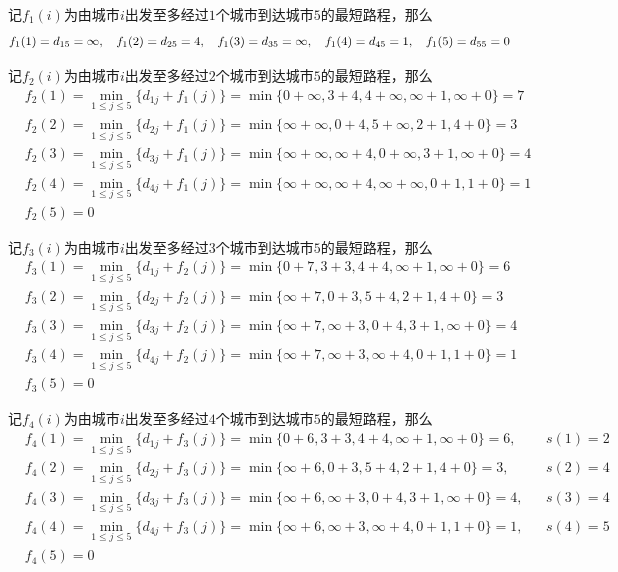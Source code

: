 \documentclass[lang = cn, scheme = chinese, thmcnt = section]{elegantbook}
\begin{document}
\begin{solution}
	记$f_1(i)$为由城市$i$出发至多经过$1$个城市到达城市$5$的最短路程，那么
	$$
	\small{
		f_1(1)=d_{15}=\infty,\quad 
		f_1(2)=d_{25}=4,\quad
		f_1(3)=d_{35}=\infty,\quad
		f_1(4)=d_{45}=1,\quad
		f_1(5)=d_{55}=0
	}
	$$
	
	记$f_2(i)$为由城市$i$出发至多经过$2$个城市到达城市$5$的最短路程，那么
	\begin{align*}
		& f_2(1)
		=\min_{1\le j \le 5}\{ d_{1j}+f_1(j) \}
		=\min\{ 0+\infty, 3+4, 4+\infty, \infty+1, \infty+0 \}
		=7\\
		& f_2(2)
		=\min_{1\le j \le 5}\{ d_{2j}+f_1(j) \}
		=\min\{ \infty+\infty, 0+4, 5+\infty, 2+1, 4+0 \}
		=3\\
		& f_2(3)=\min_{1\le j \le 5}\{ d_{3j}+f_1(j) \}
		=\min\{ \infty+\infty, \infty+4, 0+\infty, 3+1, \infty+0 \}
		=4\\
		& f_2(4)=\min_{1\le j \le 5}\{ d_{4j}+f_1(j) \}
		=\min\{ \infty+\infty, \infty+4, \infty+\infty, 0+1, 1+0 \}
		=1\\
		& f_2(5)=0
	\end{align*}
	
	记$f_3(i)$为由城市$i$出发至多经过$3$个城市到达城市$5$的最短路程，那么
	\begin{align*}
		& f_3(1)
		=\min_{1\le j \le 5}\{ d_{1j}+f_2(j) \}
		=\min\{ 0+7, 3+3, 4+4, \infty+1, \infty+0 \}
		=6\\
		& f_3(2)
		=\min_{1\le j \le 5}\{ d_{2j}+f_2(j) \}
		=\min\{ \infty+7, 0+3, 5+4, 2+1, 4+0 \}
		=3\\
		& f_3(3)
		=\min_{1\le j \le 5}\{ d_{3j}+f_2(j) \}
		=\min\{ \infty+7, \infty+3, 0+4, 3+1, \infty+0 \}
		=4\\
		& f_3(4)
		=\min_{1\le j \le 5}\{ d_{4j}+f_2(j) \}
		=\min\{ \infty+7, \infty+3, \infty+4, 0+1, 1+0 \}
		=1\\
		& f_3(5)=0
	\end{align*}
	
	记$f_4(i)$为由城市$i$出发至多经过$4$个城市到达城市$5$的最短路程，那么
	\begin{align*}
		& f_4(1)
		=\min_{1\le j \le 5}\{ d_{1j}+f_3(j) \}
		=\min\{ 0+6, 3+3, 4+4, \infty+1, \infty+0 \}
		=6,&&
		s(1)=2\\
		& f_4(2)
		=\min_{1\le j \le 5}\{ d_{2j}+f_3(j) \}
		=\min\{ \infty+6, 0+3, 5+4, 2+1, 4+0 \}
		=3,&&
		s(2)=4\\
		& f_4(3)
		=\min_{1\le j \le 5}\{ d_{3j}+f_3(j) \}
		=\min\{ \infty+6, \infty+3, 0+4, 3+1, \infty+0 \}
		=4,&&s(3)=4\\
		& f_4(4)
		=\min_{1\le j \le 5}\{ d_{4j}+f_3(j) \}
		=\min\{ \infty+6, \infty+3, \infty+4, 0+1, 1+0 \}
		=1,&&
		s(4)=5\\
		& f_4(5)=0
	\end{align*}
	

\end{solution}
\end{document}
